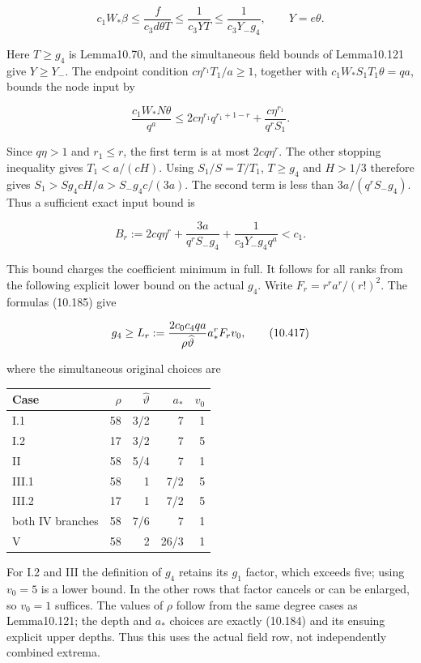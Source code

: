 \documentclass[
  11pt,
  a4paper,
]{article}
\newcounter{none} %
\begin{document}
\[
c_1W_*\beta
\le\frac{f}{c_3d\theta T}
\le\frac1{c_3YT}
\le\frac1{c_3Y_-g_4},\qquad Y=e\theta.
\tag{10.414}
\]

Here \(T\ge g_4\) is Lemma10.70, and the simultaneous field bounds of
Lemma10.121 give \(Y\ge Y_-\). The endpoint condition
\(c\eta^{r_1}T_1/a\ge1\), together with \(c_1W_*S_1T_1\theta=qa\),
bounds the node input by

\[
\frac{c_1W_*N\theta}{q^a}
\le2c\eta^{r_1}q^{r_1+1-r}
 +\frac{c\eta^{r_1}}{q^rS_1}.
\tag{10.415}
\]

Since \(q\eta>1\) and \(r_1\le r\), the first term is at most
\(2cq\eta^r\). The other stopping inequality gives \(T_1<a/(cH)\). Using
\(S_1/S=T/T_1\), \(T\ge g_4\) and \(H>1/3\) therefore gives
\(S_1>Sg_4cH/a>S_-g_4c/(3a)\). The second term is less than
\(3a/(q^rS_-g_4)\). Thus a sufficient exact input bound is

\[
B_r:=2cq\eta^r
 +\frac{3a}{q^rS_-g_4}
 +\frac1{c_3Y_-g_4q^a}<c_1.
\tag{10.416}
\]

This bound charges the coefficient minimum in full. It follows for all
ranks from the following explicit lower bound on the actual \(g_4\).
Write \(F_r=r^ra^r/(r!)^2\). The formulas (10.185) give

\[
g_4\ge L_r:={2c_0c_4qa\over\rho\widehat\vartheta}
a_*^rF_r v_0,
\tag{10.417}
\]

where the simultaneous original choices are

{\def\LTcaptype{none} %
\begin{longtable}[]{@{}lrrrr@{}}
\toprule\noalign{}
Case & \(\rho\) & \(\widehat\vartheta\) & \(a_*\) & \(v_0\) \\
\midrule\noalign{}
\endhead
\bottomrule\noalign{}
\endlastfoot
I.1 & 58 & 3/2 & 7 & 1 \\
I.2 & 17 & 3/2 & 7 & 5 \\
II & 58 & 5/4 & 7 & 1 \\
III.1 & 58 & 1 & 7/2 & 5 \\
III.2 & 17 & 1 & 7/2 & 5 \\
both IV branches & 58 & 7/6 & 7 & 1 \\
V & 58 & 2 & 26/3 & 1 \\
\end{longtable}
}

For I.2 and III the definition of \(g_4\) retains its \(g_1\) factor,
which exceeds five; using \(v_0=5\) is a lower bound. In the other rows
that factor cancels or can be enlarged, so \(v_0=1\) suffices. The
values of \(\rho\) follow from the same degree cases as Lemma10.121; the
depth and \(a_*\) choices are exactly (10.184) and its ensuing explicit
upper depths. Thus this uses the actual field row, not independently
combined extrema.
\end{document}
